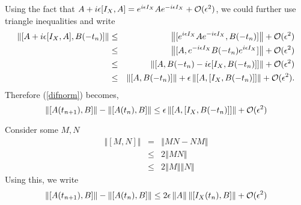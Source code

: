 \documentclass[twoside]{article}
\newcommand{\ret}{\nonumber \\}
\newcommand{\be}{\begin{equation}}
\newcommand{\ee}{\end{equation}}
\begin{document}
Using the fact that $A+i\epsilon[I_X,A]=e^{i\epsilon I_X}Ae^{-i\epsilon I_X}+{\cal O}(\epsilon^2)$, we could further use triangle inequalities and write
\begin{eqnarray}
\left\Vert[A+i\epsilon[I_X,A],B(-t_n)]\right\Vert
&\le&\left\Vert[e^{i\epsilon I_X}Ae^{-i\epsilon I_X},B(-t_n)]\right\Vert
+{\cal O}(\epsilon^2)\ret
&\le&\left\Vert[A,e^{-i\epsilon I_X}B(-t_n)e^{i\epsilon I_X}]\right\Vert
+{\cal O}(\epsilon^2)\ret
&\le&\left\Vert[A,B(-t_n)-i\epsilon[I_X,B(-t_n)]]\right\Vert
+{\cal O}(\epsilon^2)\ret
&\le&\left\Vert[A,B(-t_n)]\right\Vert+\epsilon\left\Vert[A,[I_X,B(-t_n)]]\right\Vert
+{\cal O}(\epsilon^2). 
\end{eqnarray}
Therefore (\ref{difnorm}) becomes,
\be
\left\Vert[A(t_{n+1}),B]\right\Vert-\left\Vert[A(t_n),B]\right\Vert \le \epsilon\left\Vert[A,[I_X,B(-t_n)]]\right\Vert+{\cal O}(\epsilon^2)
\ee

Consider some $M,N$
\begin{eqnarray}
\left\Vert[M,N]\right\Vert &=& \left\Vert MN - NM\right\Vert\ret
&\le& 2\left\Vert MN \right\Vert\ret
&\le& 2\left\Vert M \right\Vert\left\Vert N \right\Vert
\end{eqnarray}
Using this, we write
\be
\left\Vert[A(t_{n+1}),B]\right\Vert-\left\Vert[A(t_n),B]\right\Vert \le 2\epsilon\left\Vert A \right\Vert \left\Vert [I_X(t_n),B] \right\Vert+{\cal O}(\epsilon^2)
\ee
\end{document}
